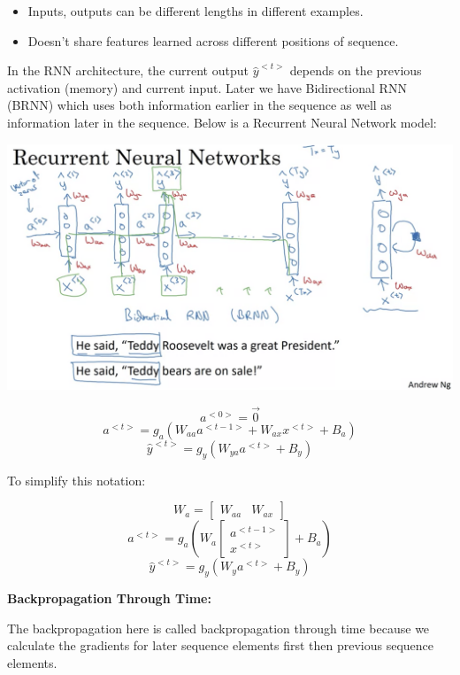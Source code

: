 \documentclass{article}
\begin{document}
\begin{itemize}
    \item Inputs, outputs can be different lengths in different examples.
    \item Doesn't share features learned across different positions of sequence.
\end{itemize}

\noindent In the RNN architecture, the current output \(\hat{y}^{<t>}\) depends on the previous activation (memory) and current input. Later we have Bidirectional RNN (BRNN) which uses both information earlier in the sequence as well as information later in the sequence. Below is a Recurrent Neural Network model:

\begin{center}
\includegraphics[scale=0.3]{./images/rnn_model.png}
\end{center}

\[a^{<0>} = \vec{0}\]
\[a^{<t>} = g_{a}(W_{aa}a^{<t - 1>} + W_{ax}x^{<t>} + B_{a})\]
\[\hat{y}^{<t>} = g_{y}(W_{ya}a^{<t>} + B_{y})\]

\noindent To simplify this notation:

\[W_{a} =
\begin{bmatrix}
W_{aa} & W_{ax}
\end{bmatrix}
\]
\[a^{<t>} = g_{a}(W_{a}
\begin{bmatrix}
a^{<t - 1>} \\
x^{<t>}
\end{bmatrix}
+ B_{a})\]
\[\hat{y}^{<t>} = g_{y}(W_{y}a^{<t>} + B_{y})\]

\noindent \textbf{Backpropagation Through Time:}

\noindent The backpropagation here is called backpropagation through time because we calculate the gradients for later sequence elements first then previous sequence elements.
\end{document}
